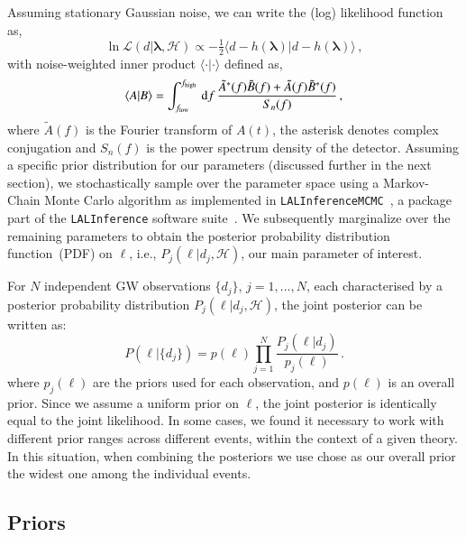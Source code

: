 Assuming stationary Gaussian noise, we can write the (log) likelihood function as,
%
\begin{equation}
\ln \mathcal{L}(d \vert \bm{\lambda},\mathcal{H}) \propto
- \tfrac{1}{2}
\langle
d - h(\bm{\lambda}) \vert d - h(\bm{\lambda})
\rangle\,,
\end{equation}
%
with noise-weighted inner product $\langle \cdot | \cdot \rangle$ defined as,
%
\begin{equation}
\langle A | B \rangle =
\int_{f_{\rm low}}^{f_{\rm high}} \, {\rm d} f \,
\frac{\tilde{A}^{\ast}(f) \tilde{B}(f) + \tilde{A}(f) \tilde{B}^{\ast}(f)}{S_{n}(f)}\,,
\end{equation}
%
where $\tilde{A}(f)$ is the Fourier transform of $A(t)$, the asterisk denotes
complex conjugation and $S_{n}(f)$ is the power spectrum density of the
detector.
%
Assuming a specific prior distribution for our parameters (discussed further in the next section), we stochastically
sample over the parameter space using a Markov-Chain Monte Carlo algorithm as implemented in
\texttt{LALInferenceMCMC}~\cite{Rover:2006ni,vanderSluys:2008qx},
a package part of the \texttt{LALInference} software suite~\cite{Veitch:2014wba,lalsuite}.
%
We subsequently marginalize over the remaining parameters to obtain the
posterior probability distribution function~(PDF) on $\ell$,  i.e., $P_j(\ell \vert d_j,\mathcal{H})$,
our main parameter of interest.

For $N$ independent GW observations $\{d_j\}$, $j=1,...,N$, each characterised
by a posterior probability distribution $P_j(\ell \vert d_j,\mathcal{H})$, the
joint posterior can be written as:
%
\begin{equation}
P(\ell | \{d_j\}) = p(\ell) \prod_{j=1}^{N} \frac{P_j(\ell | d_j)}{p_j(\ell)}\,.
\label{eq:cumulative_dist_ell}
\end{equation}
%
where $p_j(\ell)$ are the priors used for each observation, and $p(\ell)$ is an overall prior.
%
Since we assume a uniform prior on $\ell$, the joint posterior is identically
equal to the joint likelihood.
%
In some cases, we found it necessary to work with different prior ranges across
different events, within the context of a given theory.
%
In this situation, when combining the posteriors we use chose as our overall
prior the widest one among the individual events.

\subsection{Priors}

